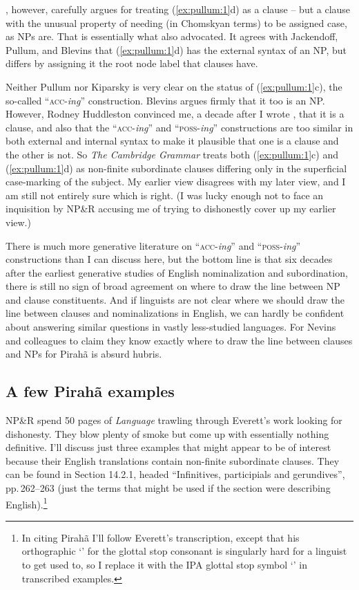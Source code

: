 \documentclass[output=paper,colorlinks,citecolor=brown
]{langscibook}
\begin{document}
\citet{Kiparsky17}, however, carefully argues for treating (\ref{ex:pullum:1}d) as
a clause -- but a clause with the unusual property of needing (in
Chomskyan terms) to be assigned case, as NPs are. That is essentially
what \citet{Stowell81} also advocated. It agrees with Jackendoff,
Pullum, and Blevins that (\ref{ex:pullum:1}d) has the external syntax of an NP, but
differs by assigning it the root node label that clauses have.

Neither Pullum nor Kiparsky is very clear on the status of (\ref{ex:pullum:1}c), the
so-called ``\textsc{acc}-\textit{ing}'' construction. Blevins argues
firmly that it too is an NP. However, Rodney Huddleston convinced me,
a decade after I wrote \citet{Pullum91}, that it is a clause, and also
that the ``\textsc{acc}-\textit{ing}'' and ``\textsc{poss}-\textit{ing}''
constructions are too similar in both external and internal syntax
to make it plausible that one is a clause and the other is not.
So \textit{The Cambridge Grammar} treats both (\ref{ex:pullum:1}c) and (\ref{ex:pullum:1}d) as
non-finite subordinate clauses differing only in the superficial
case-marking of the subject. My earlier view disagrees with my later
view, and I am still not entirely sure which is right. (I was
lucky enough not to face an inquisition by NP\&R accusing me of
trying to dishonestly cover up my earlier view.)

There is much more generative literature on ``\textsc{acc}-\textit{ing}''
and ``\textsc{poss}-\textit{ing}'' constructions than I can discuss here,
but the bottom line is that six decades after the earliest generative
studies of English nominalization and subordination, there is still
no sign of broad agreement on where to draw the line between NP and
clause constituents.  And if linguists are not clear where we should
draw the line between clauses and nominalizations in English, we can
hardly be confident about answering similar questions in vastly
less-studied languages. For Nevins and colleagues to claim they know
exactly where to draw the line between clauses and NPs for Pirah{\~a}
is absurd hubris.

\subsection{A few Pirah{\~a} examples}

NP\&R spend 50 pages of \textit{Language} trawling through Everett's
work looking for dishonesty. They blow plenty of smoke but come up
with essentially nothing definitive. I'll discuss just three examples
that might appear to be of interest because their English translations
contain non-finite subordinate clauses. They can be found in
\citet{Everett86HAL} Section 14.2.1, headed ``Infinitives, participials
and gerundives'', pp.\,262--263 (just the terms that might be used if
the section were describing English).\footnote{%
   In citing Pirah{\~a} I'll follow Everett's transcription, except
   that his orthographic `' for the glottal stop consonant is
   singularly hard for a linguist to get used to, so I replace it with the
   IPA glottal stop symbol `{\textglotstop}' in transcribed examples.}
\end{document}
